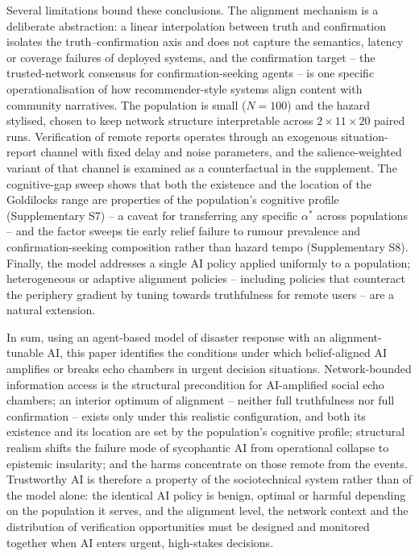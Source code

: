 \documentclass[pdflatex,sn-nature]{sn-jnl}
\begin{document}
Several limitations bound these conclusions. The alignment mechanism is a deliberate abstraction: a linear interpolation between truth and confirmation isolates the truth--confirmation axis and does not capture the semantics, latency or coverage failures of deployed systems, and the confirmation target -- the trusted-network consensus for confirmation-seeking agents -- is one specific operationalisation of how recommender-style systems align content with community narratives. The population is small ($N = 100$) and the hazard stylised, chosen to keep network structure interpretable across $2 \times 11 \times 20$ paired runs. Verification of remote reports operates through an exogenous situation-report channel with fixed delay and noise parameters, and the salience-weighted variant of that channel is examined as a counterfactual in the supplement. The cognitive-gap sweep shows that both the existence and the location of the Goldilocks range are properties of the population's cognitive profile (Supplementary S7) -- a caveat for transferring any specific $\alpha^{*}$ across populations -- and the factor sweeps tie early relief failure to rumour prevalence and confirmation-seeking composition rather than hazard tempo (Supplementary S8). Finally, the model addresses a single AI policy applied uniformly to a population; heterogeneous or adaptive alignment policies -- including policies that counteract the periphery gradient by tuning towards truthfulness for remote users -- are a natural extension.

In sum, using an agent-based model of disaster response with an alignment-tunable AI, this paper identifies the conditions under which belief-aligned AI amplifies or breaks echo chambers in urgent decision situations. Network-bounded information access is the structural precondition for AI-amplified social echo chambers; an interior optimum of alignment -- neither full truthfulness nor full confirmation -- exists only under this realistic configuration, and both its existence and its location are set by the population's cognitive profile; structural realism shifts the failure mode of sycophantic AI from operational collapse to epistemic insularity; and the harms concentrate on those remote from the events. Trustworthy AI is therefore a property of the sociotechnical system rather than of the model alone: the identical AI policy is benign, optimal or harmful depending on the population it serves, and the alignment level, the network context and the distribution of verification opportunities must be designed and monitored together when AI enters urgent, high-stakes decisions.
\end{document}
